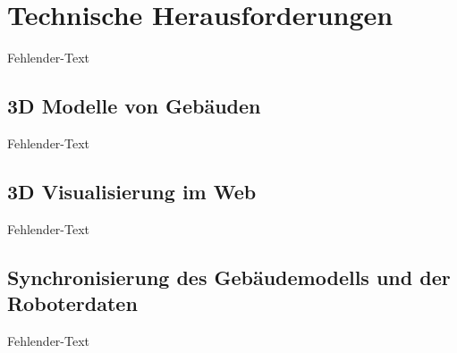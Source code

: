 \newpage
\section{Technische Herausforderungen}
Fehlender-Text

\subsection{3D Modelle von Gebäuden}
Fehlender-Text

\newpage
\subsection{3D Visualisierung im Web}
Fehlender-Text

\newpage
\subsection{Synchronisierung des Gebäudemodells und der Roboterdaten}
Fehlender-Text

